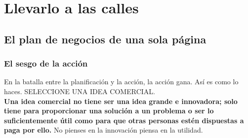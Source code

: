 \documentclass[10pt]{book}
\begin{document}
\part{Llevarlo a las calles}

    \chapter{El plan de negocios de una sola página}   

	\section{El sesgo de la acción}
	En la batalla entre la planificación y la acción, la acción gana. Así es como lo haces. SELECCIONE UNA IDEA COMERCIAL.\\
	\textbf{Una idea comercial no tiene ser una idea grande e innovadora; solo tiene para proporcionar una solución a un problema o ser lo suficientemente útil como para que otras personas estén dispuestas a paga por ello.} No pienses en la innovación piensa en la utilidad.
\end{document}
